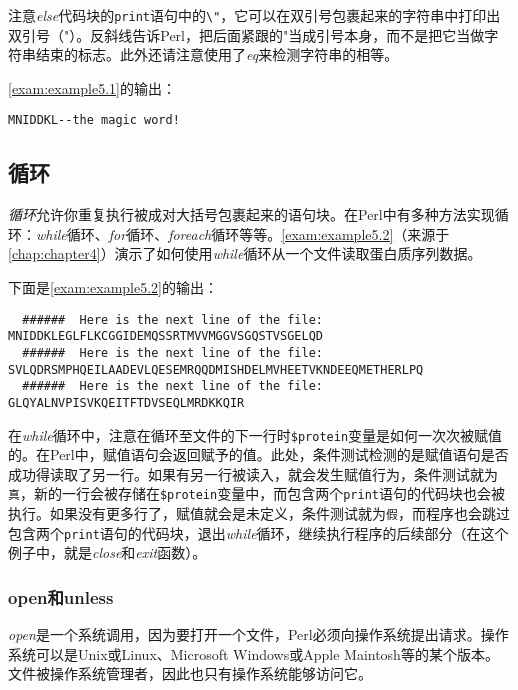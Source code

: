 

注意\textit{else}代码块的\verb|print|语句中的\verb|\"|，它可以在双引号包裹起来的字符串中打印出双引号（"）。反斜线告诉Perl，把后面紧跟的"当成引号本身，而不是把它当做字符串结束的标志。此外还请注意使用了\textit{eq}来检测字符串的相等。

\autoref{exam:example5.1}的输出：

\begin{lstlisting}
MNIDDKL--the magic word!
\end{lstlisting}

\subsection{循环}
\textit{循环}允许你重复执行被成对大括号包裹起来的语句块。在Perl中有多种方法实现循环：\textit{while}循环、\textit{for}循环、\textit{foreach}循环等等。\autoref{exam:example5.2}（来源于\autoref{chap:chapter4}）演示了如何使用\textit{while}循环从一个文件读取蛋白质序列数据。



下面是\autoref{exam:example5.2}的输出：

\begin{lstlisting}
  ######  Here is the next line of the file:
MNIDDKLEGLFLKCGGIDEMQSSRTMVVMGGVSGQSTVSGELQD
  ######  Here is the next line of the file:
SVLQDRSMPHQEILAADEVLQESEMRQQDMISHDELMVHEETVKNDEEQMETHERLPQ
  ######  Here is the next line of the file:
GLQYALNVPISVKQEITFTDVSEQLMRDKKQIR
\end{lstlisting}

在\textit{while}循环中，注意在循环至文件的下一行时\verb|$protein|变量是如何一次次被赋值的。在Perl中，赋值语句会返回赋予的值。此处，条件测试检测的是赋值语句是否成功得读取了另一行。如果有另一行被读入，就会发生赋值行为，条件测试就为\verb|真|，新的一行会被存储在\verb|$protein|变量中，而包含两个\verb|print|语句的代码块也会被执行。如果没有更多行了，赋值就会是未定义，条件测试就为\verb|假|，而程序也会跳过包含两个\verb|print|语句的代码块，退出\textit{while}循环，继续执行程序的后续部分（在这个例子中，就是\textit{close}和\textit{exit}函数）。

\subsubsection{open和unless}
\textit{open}是一个系统调用，因为要打开一个文件，Perl必须向操作系统提出请求。操作系统可以是Unix或Linux、Microsoft Windows或Apple Maintosh等的某个版本。文件被操作系统管理者，因此也只有操作系统能够访问它。

